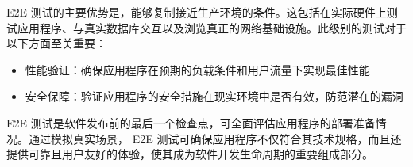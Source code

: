 
E2E 测试的主要优势是，能够复制接近生产环境的条件。这包括在实际硬件上测试应用程序、与真实数据库交互以及浏览真正的网络基础设施。此级别的测试对于以下方面至关重要：

\begin{itemize}
\item
性能验证：确保应用程序在预期的负载条件和用户流量下实现最佳性能

\item
安全保障：验证应用程序的安全措施在现实环境中是否有效，防范潜在的漏洞
\end{itemize}

E2E 测试是软件发布前的最后一个检查点，可全面评估应用程序的部署准备情况。通过模拟真实场景， E2E 测试可确保应用程序不仅符合其技术规格，而且还提供可靠且用户友好的体验，使其成为软件开发生命周期的重要组成部分。




